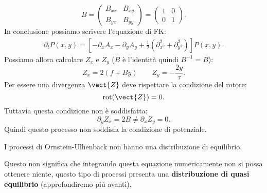 \begin{exmp}[Processo di OU]
    \[
        B = 
	\begin{pmatrix}
	    B_{xx} & B_{xy}\\
	    B_{yx} & B_{yy}
	\end{pmatrix}
	=
	\begin{pmatrix}
	    1 & 0\\
	    0 & 1
        \end{pmatrix}
    .\] 
    In conclusione possiamo scrivere l'equazione di FK:
    \[\begin{aligned}
	\partial_{t}P(x,y) = \left[-\partial_{x}A_x - \partial_{y}A_y + \frac{1}{2}(\partial^2_{x^2}+\partial^2_{y^2}) \right]P(x,y) 
    .\end{aligned}\]
    Possiamo allora calcolare $Z_x$ e $Z_y$ ($B$ è l'identità quindi $B^{-1} = B$):
    \[
	 Z_x = 2(f+By) \qquad
	 Z_y = -\frac{2y}{\tau}
    .\] 
    Per essere una divergenza $\vect{Z}$ deve rispettare la condizione del rotore:
    \[
	\text{rot}(\vect{Z}) = 0
    .\] 
    Tuttavia questa condizione non è soddisfatta:
    \[
        \partial_{y}Z_x = 2B \neq \partial_{x}Z_y = 0
    .\] 
    Quindi questo processo non soddisfa la condizione di potenziale.
    \begin{greenbox}{}
        I processi di Ornstein-Ulhenback non hanno una distribuzione di equilibrio.
    \end{greenbox}
    \noindent
    Questo non significa che integrando questa equazione numericamente non si possa ottenere niente, questo tipo di processi presenta una \textbf{distribuzione di quasi equilibrio} (approfondiremo più avanti).
\end{exmp}
\noindent
